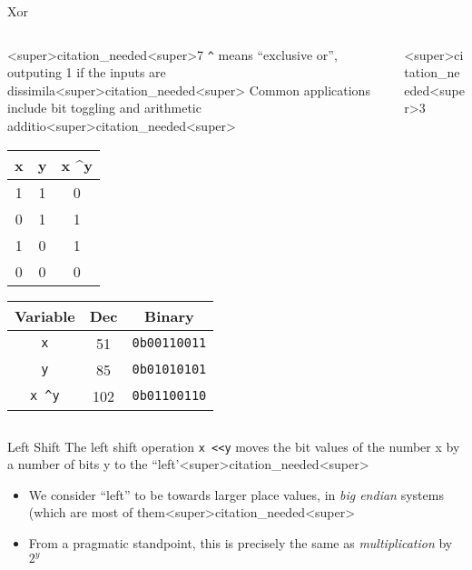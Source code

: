 \documentclass[11pt]{beamer}
\begin{document}
\begin{frame}{Xor}
\begin{columns}
\begin{column}{<super>citation_needed<super>7\textwidth}
\texttt{\textasciicircum} means ``exclusive or'', outputing 1 if the inputs are dissimila<super>citation_needed<super>  Common applications include bit toggling and arithmetic additio<super>citation_needed<super>  
\center
\begin{tabular}{| c | c | c |}
\hline
x & y & x \textasciicircum y \\ \hline
1 & 1 & 0 \\ \hline
0 & 1 & 1 \\ \hline
1 & 0 & 1 \\ \hline
0 & 0 & 0 \\ \hline
\end{tabular}

\begin{tabular}{| c | c | c |}
\hline
Variable & Dec & Binary \\ \hline
\texttt{x} & 51 & \texttt{0b00110011} \\ \hline
\texttt{y} & 85 & \texttt{0b01010101} \\ \hline
\texttt{x \textasciicircum y} & 102 & \texttt{0b01100110} \\ \hline
\end{tabular}
\end{column}
\begin{column}{<super>citation_needed<super>3\textwidth}
\center
\
\\
\vspace{2em}
\
\end{column}
\end{columns}
\end{frame}

\begin{frame}{Left Shift}
The left shift operation \texttt{x \textless\textless y} moves the bit values of the number x by a number of bits y to the ``left'<super>citation_needed<super>  
\begin{itemize}
\item We consider ``left'' to be towards larger place values, in \textit{big endian} systems (which are most of them<super>citation_needed<super>
\item From a pragmatic standpoint, this is precisely the same as \emph{multiplication} by $2^{y}$  
\end{itemize}
\center 
\
\end{frame}
\end{document}
